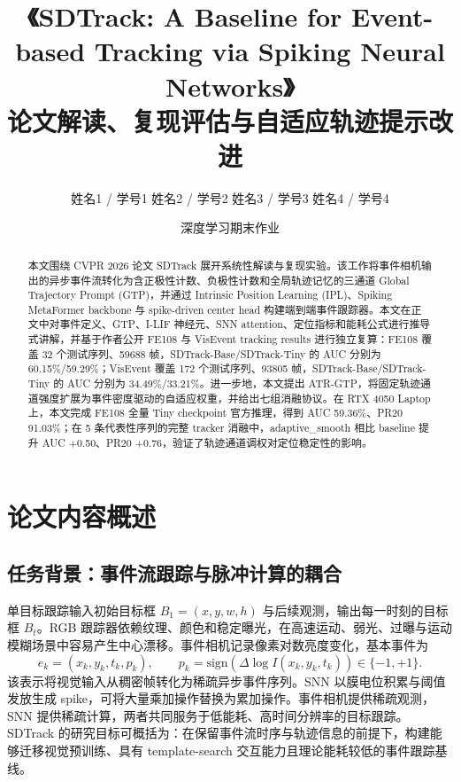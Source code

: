 \documentclass[UTF8,a4paper,zihao=-4]{ctexart}
\title{\vspace{-1.3cm}\heiti 《SDTrack: A Baseline for Event-based Tracking via Spiking Neural Networks》\\论文解读、复现评估与自适应轨迹提示改进}
\author{姓名1 / 学号1 \quad 姓名2 / 学号2 \quad 姓名3 / 学号3 \quad 姓名4 / 学号4}
\date{深度学习期末作业 \quad 2026}
\begin{document}
\songti
\maketitle
\begin{abstract}
\small
本文围绕 CVPR 2026 论文 SDTrack 展开系统性解读与复现实验。该工作将事件相机输出的异步事件流转化为含正极性计数、负极性计数和全局轨迹记忆的三通道 Global Trajectory Prompt (GTP)，并通过 Intrinsic Position Learning (IPL)、Spiking MetaFormer backbone 与 spike-driven center head 构建端到端事件跟踪器。本文在正文中对事件定义、GTP、I-LIF 神经元、SNN attention、定位指标和能耗公式进行推导式讲解，并基于作者公开 FE108 与 VisEvent tracking results 进行独立复算：FE108 覆盖 32 个测试序列、59688 帧，SDTrack-Base/SDTrack-Tiny 的 AUC 分别为 60.15\%/59.29\%；VisEvent 覆盖 172 个测试序列、93805 帧，SDTrack-Base/SDTrack-Tiny 的 AUC 分别为 34.49\%/33.21\%。进一步地，本文提出 ATR-GTP，将固定轨迹通道强度扩展为事件密度驱动的自适应权重，并给出七组消融协议。在 RTX 4050 Laptop 上，本文完成 FE108 全量 Tiny checkpoint 官方推理，得到 AUC 59.36\%、PR20 91.03\%；在 5 条代表性序列的完整 tracker 消融中，adaptive\_smooth 相比 baseline 提升 AUC +0.50、PR20 +0.76，验证了轨迹通道调权对定位稳定性的影响。
\end{abstract}

\vspace{-0.6em}
\begingroup
\small
\setlength{\parskip}{0pt}
\renewcommand{\contentsname}{目录}
\tableofcontents
\endgroup
\clearpage

\section{论文内容概述}
\subsection{任务背景：事件流跟踪与脉冲计算的耦合}
单目标跟踪输入初始目标框 $B_1=(x,y,w,h)$ 与后续观测，输出每一时刻的目标框 $B_t$。RGB 跟踪器依赖纹理、颜色和稳定曝光，在高速运动、弱光、过曝与运动模糊场景中容易产生中心漂移。事件相机记录像素对数亮度变化，基本事件为
\begin{equation}
e_k=(x_k,y_k,t_k,p_k),\qquad
p_k=\mathrm{sign}\left(\Delta \log I(x_k,y_k,t_k)\right)\in\{-1,+1\}.
\end{equation}
该表示将视觉输入从稠密帧转化为稀疏异步事件序列。SNN 以膜电位积累与阈值发放生成 spike，可将大量乘加操作替换为累加操作。事件相机提供稀疏观测，SNN 提供稀疏计算，两者共同服务于低能耗、高时间分辨率的目标跟踪。SDTrack 的研究目标可概括为：在保留事件流时序与轨迹信息的前提下，构建能够迁移视觉预训练、具有 template-search 交互能力且理论能耗较低的事件跟踪基线。
\end{document}
